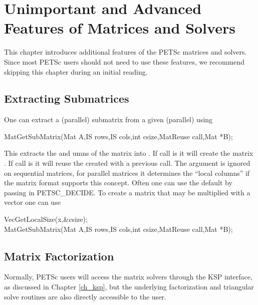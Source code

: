{{{%

\chapter{Unimportant and Advanced Features of Matrices and Solvers}
\label{ch_advanced}

This chapter introduces additional features of the PETSc matrices and solvers.
Since most PETSc users should not need to use these features, 
we recommend skipping this chapter during an initial reading.

\medskip \medskip

\section{Extracting Submatrices} 

One can extract a (parallel) submatrix from a given (parallel) using
\begin{tabbing}
  MatGetSubMatrix(Mat A,IS rows,IS cols,int csize,MatReuse call,Mat *B);
\end{tabbing}
This extracts the  and umns of the matrix  into . If 
call is    it will create the matrix
. If call is   it will reuse the 
created with a previous call.  The argument  is ignored 
on sequential matrices, for parallel matrices it determines the ``local columns'' if the matrix
format supports this concept. Often one can use the default by passing in PETSC\_DECIDE.
To create a  matrix that may be multiplied with a vector  one can use
\begin{tabbing}
  VecGetLocalSize(x,\&csize);\\
  MatGetSubMatrix(Mat A,IS rows,IS cols,int csize,MatReuse call,Mat *B);
\end{tabbing}


\medskip \medskip

\section{Matrix Factorization} 
\label{sec_matfactor}

Normally, PETSc users will access the matrix solvers through the 
KSP interface, as discussed in Chapter \ref{ch_ksp}, but the underlying 
factorization and triangular solve routines are also directly 
accessible to the user.

}}}
